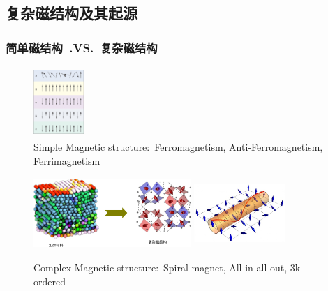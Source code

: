 \documentclass[cjk,slidestop,compress,mathserif,blue]{beamer}
\begin{document}
\subsection{复杂磁结构及其起源}
\frame
{
	\frametitle{简单磁结构~\textrm{.VS.}~复杂磁结构}
\begin{figure}[h!]
\vspace*{-0.08in}
\centering
\includegraphics[height=1.05in,width=0.75in]{Figures/Magnet-simple.png}
\caption{\tiny \textrm{Simple Magnetic structure:~Ferromagnetism, Anti-Ferromagnetism, Ferrimagnetism}}%
\label{Fig:Simple-Magnet}
\end{figure}
\begin{figure}[h!]
\vspace*{-0.08in}
\centering
\includegraphics[height=1.05in,width=2.35in]{Figures/Magnet-complex-compound.png}
\hskip 0.5pt
\includegraphics[height=1.05in,width=1.35in]{Figures/Magnet-complex.png}
\caption{\tiny \textrm{Complex Magnetic structure:~Spiral magnet, All-in-all-out, 3k-ordered}}%
\label{Fig:Simple-Magnet}
\end{figure}
}
\end{document}
